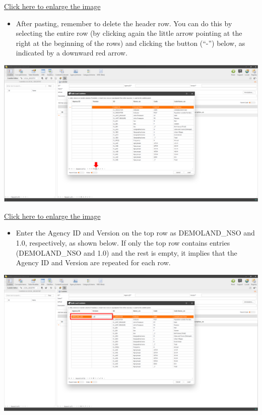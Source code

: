 \documentclass[
]{book}
\providecommand{\tightlist}{%
  \setlength{\itemsep}{0pt}\setlength{\parskip}{0pt}}
\begin{document}
\href{images/image088.png}{Click here to enlarge the image}

\begin{itemize}
\tightlist
\item
  After pasting, remember to delete the header row. You can do this by selecting the entire row (by clicking again the little arrow pointing at the right at the beginning of the rows) and clicking the button (``-'') below, as indicated by a downward red arrow.
\end{itemize}

\begin{center}\includegraphics[width=1\linewidth]{./images/image090} \end{center}

\href{images/image090.png}{Click here to enlarge the image}

\begin{itemize}
\tightlist
\item
  Enter the Agency ID and Version on the top row as DEMOLAND\_NSO and 1.0, respectively, as shown below. If only the top row contains entries (DEMOLAND\_NSO and 1.0) and the rest is empty, it implies that the Agency ID and Version are repeated for each row.
\end{itemize}

\begin{center}\includegraphics[width=1\linewidth]{./images/image092} \end{center}
\end{document}
